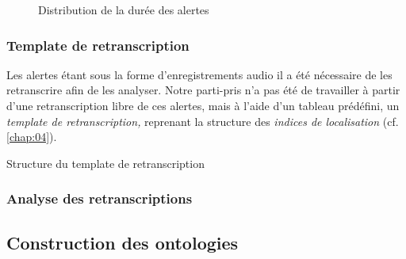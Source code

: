 \begin{figure}
  \centering
  
  \caption{Distribution de la durée des alertes}
  \label{fig:dist_temps_alertes}
\end{figure}

\subsubsection{Template de retranscription}

Les alertes étant sous la forme d'enregistrements audio il a été
nécessaire de les retranscrire afin de les analyser.
%
Notre parti-pris n'a pas été de travailler à partir d'une
retranscription libre de ces alertes, mais à l'aide d'un tableau
prédéfini, un \emph{template de retranscription,} reprenant la
structure des \emph{indices de localisation} (cf. \autoref{chap:04}).


\begin{table}
  \centering
  
  \caption{Structure du template de retranscription}
  \label{tab:struct_temp}
\end{table}

\subsubsection{Analyse des retranscriptions}

\subsection{Construction des ontologies}

